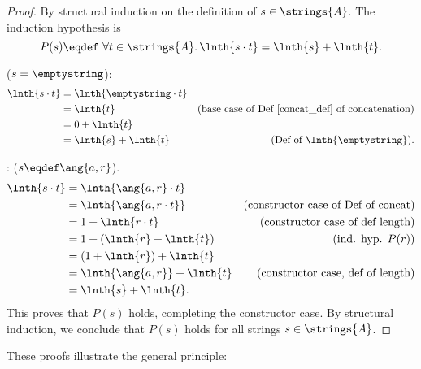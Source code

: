 \begin{proof}
By structural induction on the definition of $s \in \strings{A}$.   The
induction hypothesis is
\[
P(s) \eqdef\ \forall t \in \strings{A}.\, \lnth{s\cdot t} = \lnth{s} + \lnth{t}.
\]

 ($s = \emptystring$):
\begin{align*}
\lnth{s \cdot t}
   & = \lnth{\emptystring \cdot t}\\
   & = \lnth{t}
         & \text{(base case of Def~\ref{concat_def} of concatenation)}\\
   & = 0 + \lnth{t}\\
   & = \lnth{s} + \lnth{t}
         & \text{(Def of $\lnth{\emptystring}$)}.
\end{align*}

: ($s \eqdef \ang{a,r}$).
\begin{align*}
\lnth{s \cdot t}
    & = \lnth{\ang{a, r} \cdot t}\\
    & = \lnth{\ang{a,r \cdot t}}
        &  \text{(constructor case of Def of concat)}\\
    & = 1 + \lnth{r \cdot t}
        &  \text{(constructor case of def length)}\\
    & = 1 +  (\lnth{r} + \lnth{t})
        & \text{(ind. hyp. $P(r)$)}\\
    & = (1 +  \lnth{r}) + \lnth{t}\\
    & = \lnth{\ang{a,r}} + \lnth{t}
        & \text{(constructor case, def of length)}\\
    & = \lnth{s} + \lnth{t}.
\end{align*}
This proves that $P(s)$ holds, completing the constructor case.  By
structural induction, we conclude that $P(s)$ holds for all strings $s
\in \strings{A}$.
\end{proof}

These proofs illustrate the general principle:


